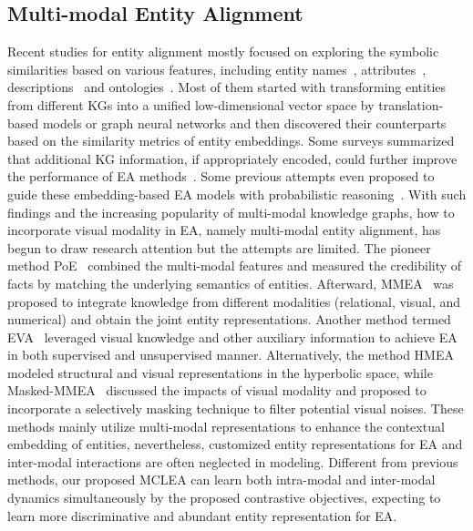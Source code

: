 \documentclass[11pt]{article}
\begin{document}
\subsection{Multi-modal Entity Alignment}

Recent studies for entity alignment mostly focused on exploring the symbolic similarities based on various features, including entity names~\cite{wu2019relation,zhang2019multi}, 
attributes~\cite{liu2020exploring}, descriptions~\cite{zhang2019multi,tang2021bert} and ontologies~\cite{xiang2021ontoea}.
Most of them started with transforming entities from different KGs into a unified low-dimensional vector space by translation-based models or graph neural networks and then discovered their counterparts based on the similarity metrics of entity embeddings.
Some surveys summarized that additional KG information, if appropriately encoded, could further improve the performance of EA methods~\cite{ZQW2020VLDB,ZJX2020COLING}.
Some previous attempts even proposed to guide these embedding-based EA models with probabilistic reasoning~\cite{qi2021unsupervised}.
With such findings and the increasing popularity of multi-modal knowledge graphs, how to incorporate visual modality in EA, namely multi-modal entity alignment, has begun to draw research attention but the attempts are limited.
The pioneer method PoE~\cite{liu2019mmkg} combined the multi-modal features and measured the credibility of facts by matching the underlying semantics of entities.
Afterward, MMEA~\cite{chen2020mmea} was proposed to integrate knowledge from different modalities (relational, visual, and numerical) and obtain the joint entity representations.
Another method termed EVA~\cite{liu2021visual} leveraged visual knowledge and other auxiliary information to achieve EA in both supervised and unsupervised manner.
Alternatively, the method HMEA~\cite{guo2021multi} modeled structural and visual representations in the hyperbolic space, while Masked-MMEA~\cite{shi2022prob} discussed the impacts of visual modality and proposed to incorporate a selectively masking technique to filter potential visual noises.
These methods mainly utilize multi-modal representations to enhance the contextual embedding of entities, nevertheless, customized entity representations for EA and inter-modal interactions are often neglected in modeling.
Different from previous methods, our proposed MCLEA can learn both intra-modal and inter-modal dynamics simultaneously by the proposed contrastive objectives, expecting to learn more discriminative and abundant entity representation for EA.
 
\end{document}
